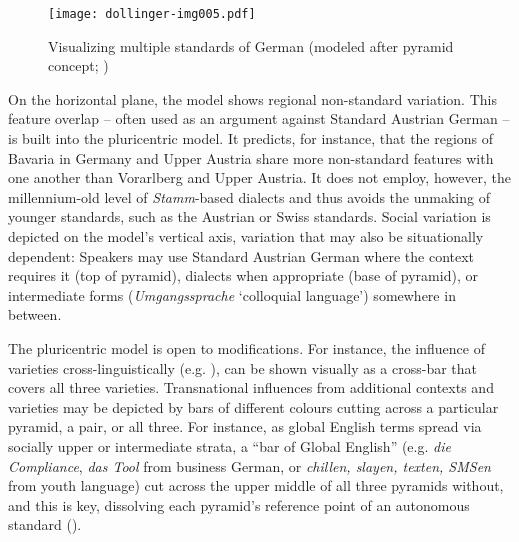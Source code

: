 \documentclass[output=paper]{langscibook}
\begin{document}
\begin{figure}
\texttt{[image: dollinger-img005.pdf]}
\caption{Visualizing multiple standards of German (modeled after  pyramid concept; \citealt[39]{Dollinger2019c})}
\label{fig:dollinger:3}
\end{figure}


On the horizontal plane, the model shows regional non-standard variation. This feature overlap – often used as an argument against Standard Austrian German – is built into the pluricentric model. It predicts, for instance, that the regions of Bavaria in Germany and Upper Austria share more non-standard features with one another than Vorarlberg and Upper Austria. It does not employ, however, the millennium-old level of \textit{Stamm}-based dialects and thus avoids the unmaking of younger standards, such as the Austrian or Swiss standards. Social variation is depicted on the model’s vertical axis, variation that may also be situationally dependent: Speakers may use Standard Austrian German where the context requires it (top of pyramid), dialects when appropriate (base of pyramid), or intermediate forms (\textit{Umgangssprache} `colloquial language') somewhere in between.



The pluricentric model is open to modifications. For instance, the influence of varieties cross-linguistically (e.g. \citealt{BuschfeldKautzsch2020,Schneider2022}), can be shown visually as a cross-bar that covers all three varieties. Transnational influences from additional contexts and varieties may be depicted by bars of different colours cutting across a particular pyramid, a pair, or all three. For instance, as global English terms spread via socially upper or intermediate strata, a “bar of Global English” (e.g. \textit{die Compliance}, \textit{das Tool} from business German, or \textit{chillen, slayen, texten, SMSen} from youth language) cut across the upper middle of all three pyramids without, and this is key, dissolving each pyramid’s reference point of an autonomous standard ().
\end{document}
